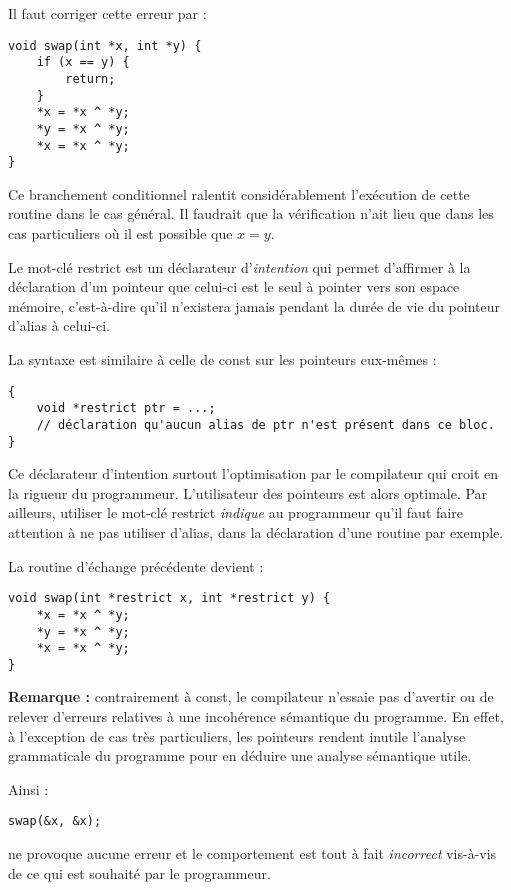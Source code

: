\documentclass[../../../main.tex]{subfiles}
\begin{document}
Il faut corriger cette erreur par :
\begin{verbatim}
void swap(int *x, int *y) {
	if (x == y) {
		return;
	}
	*x = *x ^ *y;
	*y = *x ^ *y;
	*x = *x ^ *y;
}
\end{verbatim}
Ce branchement conditionnel ralentit considérablement l'exécution de cette routine dans le cas général. Il faudrait que la vérification n'ait lieu que dans les cas particuliers où il est possible que $x = y$.

Le mot-clé \textsf{restrict} est un déclarateur d'\textit{intention} qui permet d'affirmer à la déclaration d'un pointeur que celui-ci est le seul à pointer vers son espace mémoire, c'est-à-dire qu'il n'existera jamais pendant la durée de vie du pointeur d'alias à celui-ci. 

La syntaxe est similaire à celle de \textsf{const} sur les pointeurs eux-mêmes :
\begin{verbatim}
{
	void *restrict ptr = ...;
	// déclaration qu'aucun alias de ptr n'est présent dans ce bloc.
}
\end{verbatim}
Ce déclarateur d'intention surtout l'optimisation par le compilateur qui croit en la rigueur du programmeur. L'utilisateur des pointeurs est alors optimale. Par ailleurs, utiliser le mot-clé \textsf{restrict} \textit{indique} au programmeur qu'il faut faire attention à ne pas utiliser d'alias, dans la déclaration d'une routine par exemple.

La routine d'échange précédente devient :
\begin{verbatim}
void swap(int *restrict x, int *restrict y) {
	*x = *x ^ *y;
	*y = *x ^ *y;
	*x = *x ^ *y;
}
\end{verbatim}
\textbf{Remarque :} contrairement à \textsf{const}, le compilateur n'essaie pas d'avertir ou de relever d'erreurs relatives à une incohérence sémantique du programme. En effet, à l'exception de cas très particuliers, les pointeurs rendent inutile l'analyse grammaticale du programme pour en déduire une analyse sémantique utile.

Ainsi :
\begin{verbatim}
swap(&x, &x);
\end{verbatim}
ne provoque aucune erreur et le comportement est tout à fait \textit{incorrect} vis-à-vis de ce qui est souhaité par le programmeur.
\end{document}
